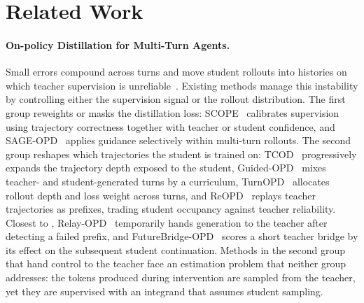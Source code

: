 \section{Related Work}
\label{sec:related_work}

\vspace{-0.5em}
\paragraph{On-policy Distillation for Multi-Turn Agents.}
Small errors compound across turns and move student rollouts into histories on which teacher supervision is unreliable~\citep{abs-2605-07725,abs-2604-24005,abs-2606-15912}.
Existing methods manage this instability by controlling either the supervision signal or the rollout distribution.
The first group reweights or masks the distillation loss: SCOPE~\citep{abs-2604-10688} calibrates supervision using trajectory correctness together with teacher or student confidence, and SAGE-OPD~\citep{abs-2606-19659} applies guidance selectively within multi-turn rollouts.
The second group reshapes which trajectories the student is trained on: TCOD~\citep{abs-2604-24005} progressively expands the trajectory depth exposed to the student, Guided-OPD~\citep{abs-2606-15912} mixes teacher- and student-generated turns by a curriculum, TurnOPD~\citep{abs-2607-05804} allocates rollout depth and loss weight across turns, and ReOPD~\citep{abs-2607-04763} replays teacher trajectories as prefixes, trading student occupancy against teacher reliability.
Closest to \name, Relay-OPD~\citep{abs-2607-26057} temporarily hands generation to the teacher after detecting a failed prefix, and FutureBridge-OPD~\citep{abs-2608-01953} scores a short teacher bridge by its effect on the subsequent student continuation.
Methods in the second group that hand control to the teacher face an estimation problem that neither group addresses: the tokens produced during intervention are sampled from the teacher, yet they are supervised with an integrand that assumes student sampling.

\vspace{-0.5em}
